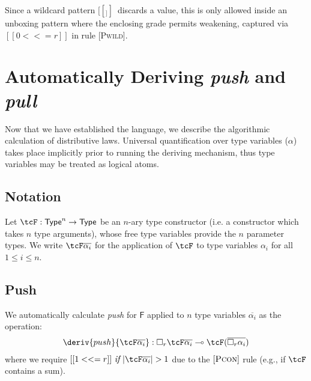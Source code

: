 Since a wildcard pattern $[[ _ ]]\,$ discards a value, this is only
allowed inside an unboxing pattern where the enclosing grade
permits weakening, captured via $[[ 0 <<= r ]]$ in rule \textsc{[Pwild]}.


\section{Automatically Deriving \emph{push} and \emph{pull}}
\label{sec:push-pull-deriv}
Now that we have established the language, we describe the algorithmic
calculation of distributive laws. Universal quantification over type variables
($\alpha$) takes place implicitly prior to running the deriving mechanism, thus
 type variables may be treated as logical atoms.

%
\subsection{Notation}
Let $\tcF : \mathsf{Type}^n \rightarrow \mathsf{Type}$
be an $n$-ary type constructor (i.e. a constructor which takes $n$ type arguments), whose free type variables
provide the $n$ parameter types. We write $\tcF \overline{\alpha_i}$ for
the application of $\tcF$ to
type variables $\alpha_i$ for all $1 \leq i \leq n$.

%
\subsection{Push}
We automatically
calculate \emph{push} for $\mathsf{F}$
applied to $n$ type variables
$\overline{\alpha_i}$
as the operation:
%
\begin{align*}
\deriv{push}{\tcF \overline{\alpha_i}} : \Box_{r} \tcF \overline{\alpha_i}
  \multimap  \tcF  (\overline{\Box_{r} \alpha_i})
 \end{align*}
where we require $[[ 1 <<= r ]]\ \textit{if}\ |\tcF \overline{\alpha_i}| > 1$
due to the $[\textsc{Pcon}]$ rule (e.g., if $\tcF$ contains a sum).

